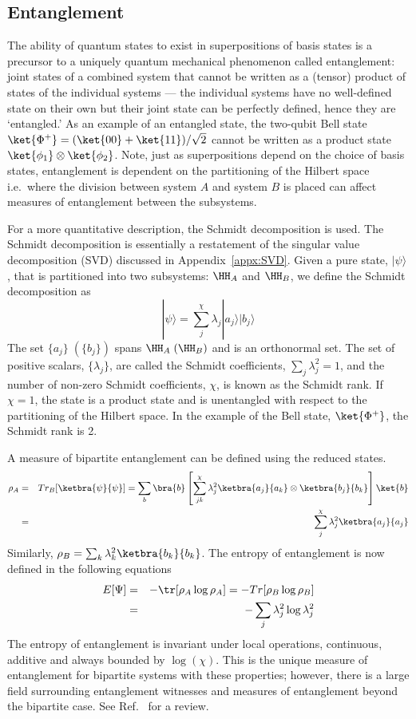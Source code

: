 \documentclass[11pt,oneside,final]{huthesis}%
\begin{document}
\subsection{Entanglement}\label{sec:entanglement}
The ability of quantum states to exist in superpositions
of basis states is a precursor to a uniquely quantum 
mechanical phenomenon called entanglement: joint states 
of a combined system that cannot be written as a
(tensor) product of states of the individual systems ---
the individual systems have no well-defined state on their 
own but their joint state can be perfectly defined, hence 
they are `entangled.' As an example of an entangled state, the two-qubit Bell state $\ket{\Phi^+}=(\ket{00}+\ket{11})/\sqrt{2}$ cannot
be written as a product state $\ket{\phi_1}\otimes\ket{\phi_2}$.
Note, just as superpositions depend 
on the choice of basis states, entanglement is dependent on 
the partitioning of the Hilbert space i.e.~where the division
between system $A$ and system $B$ is placed can affect 
measures of entanglement between the subsystems.

For a more quantitative description, the Schmidt decomposition is used. The Schmidt decomposition is essentially a restatement of the singular value decomposition (SVD) discussed in Appendix~\ref{appx:SVD}.  Given a pure state, $|\psi\rangle$, that is partitioned into two subsystems: $\HH_A$ and $\HH_B$, we define the Schmidt decomposition as
$$|\psi\rangle=\sum_j^\chi \lambda_j |a_j\rangle |b_j\rangle$$  
The set $\{a_j\}\;(\{b_j\})$ spans $\HH_A \;(\HH_B)$ and is an orthonormal set.  The set of positive scalars, $\{\lambda_j\}$, are called the Schmidt coefficients, $\sum_j \lambda_j^2=1$, and the number of non-zero Schmidt coefficients, $\chi$, is known as the Schmidt rank. If $\chi=1$, the state is a {product state} and is unentangled with respect to the partitioning of the Hilbert space.  In the example of the Bell state, $\ket{\Phi^+}$, the Schmidt rank is 2.

A measure of bipartite entanglement can be defined using the reduced states.
\begin{eqnarray}
\rho_A&=&Tr_B[\ketbra{\psi}{\psi}]=
  \sum_b\bra{b}\left[\sum^\chi_{jk} \lambda_j^2 
\ketbra{a_j}{a_k}\otimes\ketbra{b_j}{b_k}\right]\ket{b}\\
&=&\sum_j^\chi\lambda_j^2\ketbra{a_j}{a_j}  
\end{eqnarray}
Similarly, $\rho_B=\sum_k \lambda_k^2\ketbra{b_k}{b_k}$.  
The entropy of entanglement is now defined in the following equations
\begin{eqnarray}
E[\Psi]
&=&-\tr[\rho_A\log\rho_A]
 = -Tr[\rho_B\log\rho_B]\\
&=&-\sum_j\lambda^2_j\log\lambda_j^2
\end{eqnarray}
The entropy of entanglement is invariant under local operations, continuous, additive and always bounded by $\log(\chi)$.  This is the unique measure of entanglement for bipartite systems with these properties; however, there is a large field surrounding entanglement witnesses and measures of entanglement beyond the bipartite case. See Ref.~\cite{Amico08} for a review.  
\end{document}
